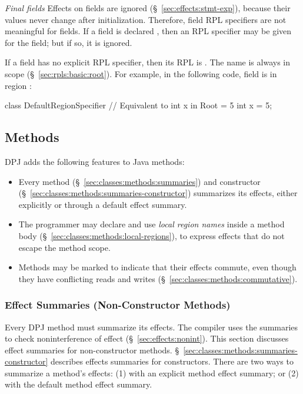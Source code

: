 \emph{Final fields} Effects on  fields are ignored
(\S~\ref{sec:effects:stmt-exp}), because their values never change
after initialization.  Therefore, field RPL specifiers are not
meaningful for  fields.  If a field is declared
, then an RPL specifier may be given for the field; but if
so, it is ignored.

 If a field has no explicit RPL specifier,
then its RPL is .  The name  is always in scope
(\S~\ref{sec:rpls:basic:root}).  For example, in the following code,
field  is in region :
%
\begin{dpjlisting}
class DefaultRegionSpecifier {
  // Equivalent to int x in Root = 5
  int x = 5;
}
\end{dpjlisting}


\subsection{Methods%
\label{sec:classes:methods}}

DPJ adds the following features to Java methods:
%
\begin{itemize}
%
\item Every method (\S~\ref{sec:classes:methods:summaries}) and
  constructor (\S~\ref{sec:classes:methods:summaries-constructor})
  summarizes its effects, either explicitly or through a default
  effect summary.
%
\item The programmer may declare and use \emph{local region names}
  inside a method body (\S~\ref{sec:classes:methods:local-regions}),
  to express effects that do not escape the method scope.
%
\item Methods may be marked  to indicate that their
  effects commute, even though they have conflicting reads and writes
  (\S~\ref{sec:classes:methods:commutative}).
%
\end{itemize}

\subsubsection{Effect Summaries (Non-Constructor Methods)%
\label{sec:classes:methods:summaries}}

Every DPJ method must summarize its effects.  The compiler uses the
summaries to check noninterference of effect
(\S~\ref{sec:effects:nonint}).  This section discusses effect
summaries for non-constructor methods.
\S~\ref{sec:classes:methods:summaries-constructor} describes effects
summaries for constructors.  There are two ways to summarize a
method's effects: (1) with an explicit method effect summary; or (2)
with the default method effect summary.

